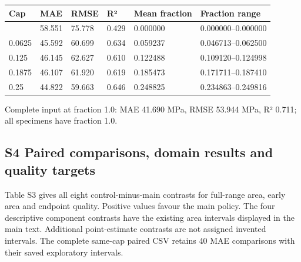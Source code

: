\documentclass[11pt,a4paper]{article}
\begin{document}
{ %
\begin{longtable}[]{@{}llllll@{}}
\toprule\noalign{}
Cap & MAE & RMSE & R² & Mean fraction & Fraction range \\
\midrule\noalign{}
\endhead
\bottomrule\noalign{}
\endlastfoot
0.0 & 58.551 & 75.778 & 0.429 & 0.000000 & 0.000000--0.000000 \\
0.0625 & 45.592 & 60.699 & 0.634 & 0.059237 & 0.046713--0.062500 \\
0.125 & 46.145 & 62.627 & 0.610 & 0.122488 & 0.109120--0.124998 \\
0.1875 & 46.107 & 61.920 & 0.619 & 0.185473 & 0.171711--0.187410 \\
0.25 & 44.822 & 59.663 & 0.646 & 0.248825 & 0.234863--0.249816 \\
\end{longtable}
}

Complete input at fraction 1.0: MAE 41.690 MPa, RMSE 53.944 MPa, R² 0.711; all specimens have fraction 1.0.

\subsection{S4 Paired comparisons, domain results and quality targets}\label{s4-paired-comparisons-domain-results-and-quality-targets}

Table S3 gives all eight control-minus-main contrasts for full-range area, early area and endpoint quality. Positive values favour the main policy. The four descriptive component contrasts have the existing area intervals displayed in the main text. Additional point-estimate contrasts are not assigned invented intervals. The complete same-cap paired CSV retains 40 MAE comparisons with their saved exploratory intervals.
\end{document}
